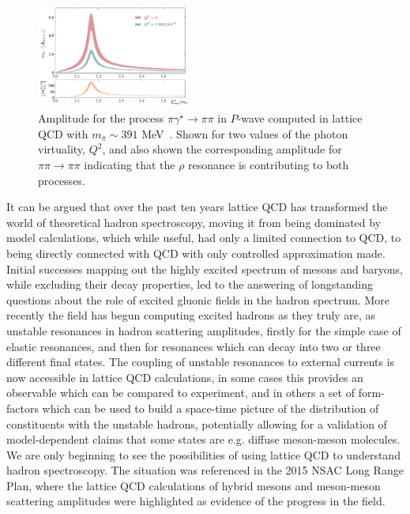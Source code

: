 \begin{figure}
\includegraphics[width=0.45\textwidth]{figures/rho_pi_gamma}
\caption{Amplitude for the process ${\pi \gamma^\star \to \pi\pi}$ in $P$-wave computed in lattice QCD with $m_\pi \sim 391$ MeV~\cite{Briceno:2016kkp,Briceno:2015dca}. Shown for two values of the photon virtuality, $Q^2$, and also shown the corresponding amplitude for $\pi\pi \to \pi \pi$ indicating that the $\rho$ resonance is contributing to both processes.  }
\label{rhopigamma}
\end{figure}

\vspace{5mm}
It can be argued that over the past ten years lattice QCD has transformed the world of theoretical hadron spectroscopy, moving it from being dominated by model calculations, which while useful, had only a limited connection to QCD, to being directly connected with QCD with only controlled approximation made. Initial successes mapping out the highly excited spectrum of mesons and baryons, while excluding their decay properties, led to the answering of longstanding questions about the role of excited gluonic fields in the hadron spectrum. More recently the field has begun computing excited hadrons as they truly are, as unstable resonances in hadron scattering amplitudes, firstly for the simple case of elastic resonances, and then for resonances which can decay into two or three different final states. The coupling of unstable resonances to external currents is now accessible in lattice QCD calculations, in some cases this provides an observable which can be compared to experiment, and in others a set of form-factors which can be used to build a space-time picture of the distribution of constituents with the unstable hadrons, potentially allowing for a validation of model-dependent claims that some states are e.g. diffuse meson-meson molecules. We are only beginning to see the possibilities of using lattice QCD to understand hadron spectroscopy. The situation was referenced in the 2015 NSAC Long Range Plan, where the lattice QCD calculations of hybrid mesons and meson-meson scattering amplitudes were highlighted as evidence of the progress in the field.

